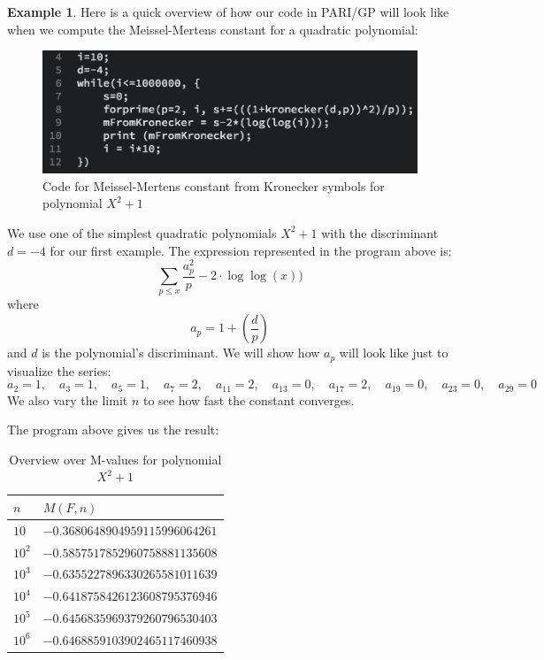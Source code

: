 \documentclass{article}
\theoremstyle{definition}
\newtheorem{example}{Example}[section]
\theoremstyle{remark}
\begin{document}
\begin{example}
Here is a quick overview of how our code in PARI/GP will look like when we compute the Meissel-Mertens constant for a quadratic polynomial:

\begin{figure}[H]
\centering\includegraphics[width = 0.7 \textwidth]{mFromKronecker-d-4.png}
\caption{\label{fig: Kroneckertest} Code for Meissel-Mertens constant from Kronecker symbols for polynomial $X^2+1$}
\end{figure}
We use one of the simplest quadratic polynomials $X^2+1$ with the discriminant $d = -4$ for our first example. The expression represented in the program above is:
$$\sum_{p\leq x} \frac{a_p^2}{p}-2\cdot \log\log(x))$$
where
$$a_p = 1+\left(\frac{d}{p}\right)$$
and $d$ is the polynomial's discriminant. We will show how $a_p$ will look like just to visualize the series:
$$a_2 = 1, \quad a_3 = 1, \quad a_5 = 1, \quad a_7 = 2, \quad a_{11} = 2, \quad a_{13} = 0, \quad a_{17} = 2, \quad a_{19} = 0, \quad a_{23} = 0, \quad a_{29} = 0$$
\newline
We also vary the limit $n$ to see how fast the constant converges.

The program above gives us the result:
\begin{table}[H]
\centering
\label{example4-3table}
\begin{tabular}{|l|l|}
\hline
$n$      & $M(F,n)$                                                     \\ \hline
$10$   & $-0.3680648904959115996064261$ \\ \hline
$10^2$ & $-0.5857517852960758881135608$ \\ \hline
$10^3$ & $-0.6355227896330265581011639$ \\ \hline
$10^4$ & $-0.6418758426123608795376946$ \\ \hline
$10^5$ & $-0.6456835969379260796530403$ \\ \hline
$10^6$ & $-0.6468859103902465117460938$ \\ \hline
\end{tabular}
\caption{Overview over M-values for polynomial $X^2+1$}
\end{table}
\end{example}
\end{document}

